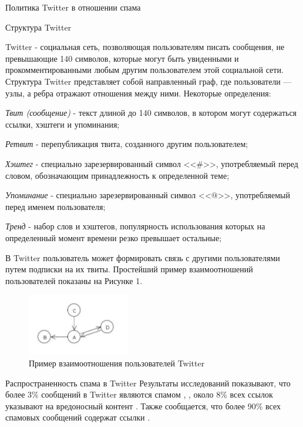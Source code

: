 
\clearpage
\begin{section}{Политика Twitter в отношении спама}

\begin{subsection} {Структура Twitter}

  Twitter - социальная сеть, позволяющая пользователям писать сообщения, не превышающие 140 символов, которые могут быть увиденными и прокомментированными любым другим пользователем этой социальной сети. Структура Twitter представляет собой направленный граф, где пользователи — узлы, а ребра отражают отношения между ними.
  Некоторые определения:

  \textit{Твит (сообщение)}  - текст длиной до 140 символов, в котором могут содержаться ссылки, хэштеги и упоминания;

  \textit{Ретвит} - перепубликация твита, созданного другим пользователем;

  \textit{Хэштег} - специально зарезервированный символ <<\#>>, употребляемый перед словом, обозначающим принадлежность к определенной теме;

  \textit{Упоминание} - специально зарезервированный символ <<@>>, употребляемый перед именем пользователя;

  \textit{Тренд} - набор слов и хэштегов, популярность использования которых на определенный момент времени резко превышает остальные;

  В Twitter пользователь может формировать связь с другими пользователями путем подписки на их твиты. Простейший пример взаимоотношений пользователей показаны на Рисунке 1.
  \begin{figure}[ht!]
  \centering
  \includegraphics[width=0.4\textwidth]{pics/TwitterGraph}
  \caption{Пример взаимоотношения пользователей Twitter}
  \label{pic:TwitterGraph}
  \end{figure}

\end{subsection}
\begin{subsection}{Распространенность спама в Twitter}
Результаты исследований показывают, что более 3\% сообщений в Twitter являются спамом \cite{Kelly}, \cite{Wang}, около 8\% всех ссылок указывают на вредоносный контент \cite{Grier}. Также сообщается, что более 90\% всех спамовых сообщений содержат ссылки \cite{Benevenuto}.


\end{subsection}
\end{section}

